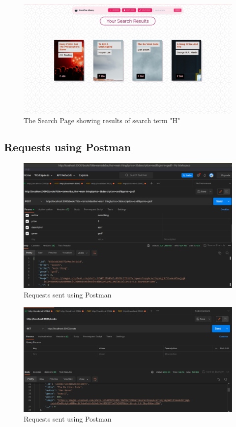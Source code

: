 \documentclass[11pt]{article}
\begin{document}
\begin{figure}[H]
    \centering
    \includegraphics[width=.95\textwidth]{Screenshots/search.png}
    \caption{The Search Page showing results of search term "H"}
\end{figure}

\subsection{Requests using Postman}

\begin{figure}[H]
    \centering
    \includegraphics[width=.95\textwidth]{Screenshots/postman 1.png}
    \caption{Requests sent using Postman}
\end{figure}

\begin{figure}[H]
    \centering
    \includegraphics[width=.95\textwidth]{Screenshots/postman 2.png}
    \caption{Requests sent using Postman}
\end{figure}
\end{document}

